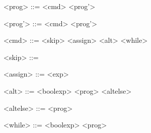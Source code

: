 \begin{grammarEx}
	<prog> ::= <cmd> <prog'> 
	
	<prog'> ::= \lit{;} <cmd> <prog'>
	\alt \textemptyword{} 

	<cmd> ::= <skip>
	\alt <assign>
	\alt <alt>
	\alt <while>
	
	<skip> ::=  
	
	<assign> ::=  \lit{\opassign{}} <exp> 
	
	<alt> ::=  <bool\textunderscore exp>  <prog> <alt\textunderscore else>  
	
	<alt\textunderscore else> ::=  <prog> 
	\alt \straightepsilon{} 
	
	<while> ::=  <bool\textunderscore exp>  <prog>  
\end{grammarEx}